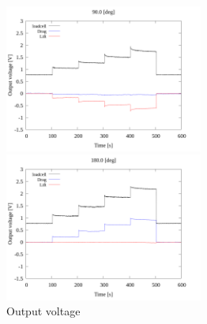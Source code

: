 \begin{figure}[htbp]
\begin{minipage}[b]{0.45\linewidth}
  \end{minipage}\\
  \begin{minipage}[b]{0.45\linewidth}
    \centering
    \includegraphics[width=65mm]{../../02_workspace/result/2-1/plot/01-3_allsensors/01_allsensors_900.png}
  \end{minipage}
  \begin{minipage}[b]{0.45\linewidth}
    \centering
    \includegraphics[width=65mm]{../../02_workspace/result/2-1/plot/01-3_allsensors/01_allsensors_1800.png}
  \end{minipage}
  \caption{Output voltage}
\end{figure}


